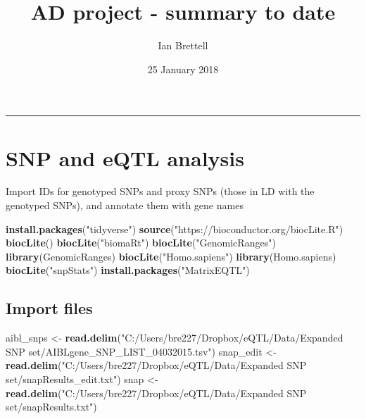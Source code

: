 \documentclass[]{article}
\title{AD project - summary to date}
\author{Ian Brettell}
\date{25 January 2018}
\newenvironment{Shaded}{\begin{snugshade}}{\end{snugshade}}
\newcommand{\KeywordTok}[1]{\textcolor[rgb]{0.13,0.29,0.53}{\textbf{#1}}}
\newcommand{\StringTok}[1]{\textcolor[rgb]{0.31,0.60,0.02}{#1}}
\newcommand{\NormalTok}[1]{#1}
\begin{document}
\maketitle

{
\setcounter{tocdepth}{2}
\tableofcontents
}
\begin{center}\rule{0.5\linewidth}{\linethickness}\end{center}

\section{SNP and eQTL analysis}\label{snp-and-eqtl-analysis}

Import IDs for genotyped SNPs and proxy SNPs (those in LD with the
genotyped SNPs), and annotate them with gene names

\begin{Shaded}
\begin{Highlighting}[]
\KeywordTok{install.packages}\NormalTok{(}\StringTok{"tidyverse"}\NormalTok{)}
\KeywordTok{source}\NormalTok{(}\StringTok{"https://bioconductor.org/biocLite.R"}\NormalTok{)}
\KeywordTok{biocLite}\NormalTok{()}
\KeywordTok{biocLite}\NormalTok{(}\StringTok{"biomaRt"}\NormalTok{)}
\KeywordTok{biocLite}\NormalTok{(}\StringTok{"GenomicRanges"}\NormalTok{)}
\KeywordTok{library}\NormalTok{(GenomicRanges)}
\KeywordTok{biocLite}\NormalTok{(}\StringTok{"Homo.sapiens"}\NormalTok{)}
\KeywordTok{library}\NormalTok{(Homo.sapiens)}
\KeywordTok{biocLite}\NormalTok{(}\StringTok{"snpStats"}\NormalTok{)}
\KeywordTok{install.packages}\NormalTok{(}\StringTok{"MatrixEQTL"}\NormalTok{)}
\end{Highlighting}
\end{Shaded}

\subsection{Import files}\label{import-files}

\begin{Shaded}
\begin{Highlighting}[]
\NormalTok{aibl_snps <-}\StringTok{ }\KeywordTok{read.delim}\NormalTok{(}\StringTok{"C:/Users/bre227/Dropbox/eQTL/Data/Expanded SNP set/AIBLgene_SNP_LIST_04032015.tsv"}\NormalTok{)}
\NormalTok{snap_edit <-}\StringTok{ }\KeywordTok{read.delim}\NormalTok{(}\StringTok{"C:/Users/bre227/Dropbox/eQTL/Data/Expanded SNP set/snapResults_edit.txt"}\NormalTok{)}
\NormalTok{snap <-}\StringTok{ }\KeywordTok{read.delim}\NormalTok{(}\StringTok{"C:/Users/bre227/Dropbox/eQTL/Data/Expanded SNP set/snapResults.txt"}\NormalTok{)}
\end{Highlighting}
\end{Shaded}
\end{document}
